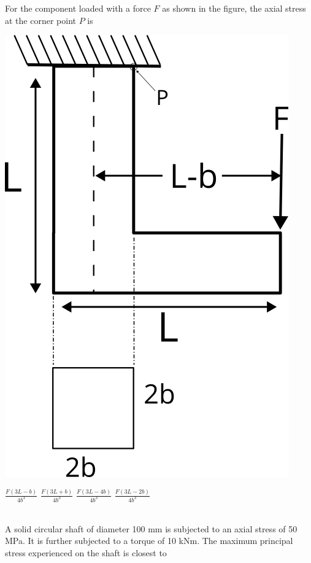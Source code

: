 \documentclass[addpoints,11pt]{exam}
\begin{document}
\begin{questions}
        \question For the component loaded with a force $F$ as shown in the figure, the axial stress at the corner point $P$ is\\

        \begin{center}
            \includegraphics[scale=0.3]{q31}
        \end{center}

        \begin{oneparchoices}
            \choice $\frac{F(3L-b)}{4b^3}$
            \choice $\frac{F(3L+b)}{4b^3}$
            \choice $\frac{F(3L-4b)}{4b^3}$
            \choice $\frac{F(3L-2b)}{4b^3}$
        \end{oneparchoices}\\

        \question A solid circular shaft of diameter 100 mm is subjected to an axial stress of 50 MPa. It is further subjected to a torque of 10 kNm. The maximum principal stress experienced on the shaft is closest to\\


\end{questions}
\end{document}
